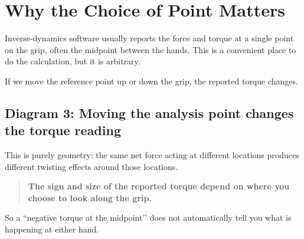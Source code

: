 \documentclass[12pt]{article}
\begin{document}
\section{Why the Choice of Point Matters}

Inverse-dynamics software usually reports the force and torque at a single point on the grip, often the midpoint between the hands.  
This is a convenient place to do the calculation, but it is arbitrary.

If we move the reference point up or down the grip, the reported torque changes.

\subsection*{Diagram 3: Moving the analysis point changes the torque reading}

\begin{center}
\end{center}

This is purely geometry: the same net force acting at different locations produces different twisting effects around those locations.

\begin{quote}
\textbf{The sign and size of the reported torque depend on where you choose to look along the grip.}
\end{quote}

So a ``negative torque at the midpoint’’ does not automatically tell you what is happening at either hand.

\end{document}
